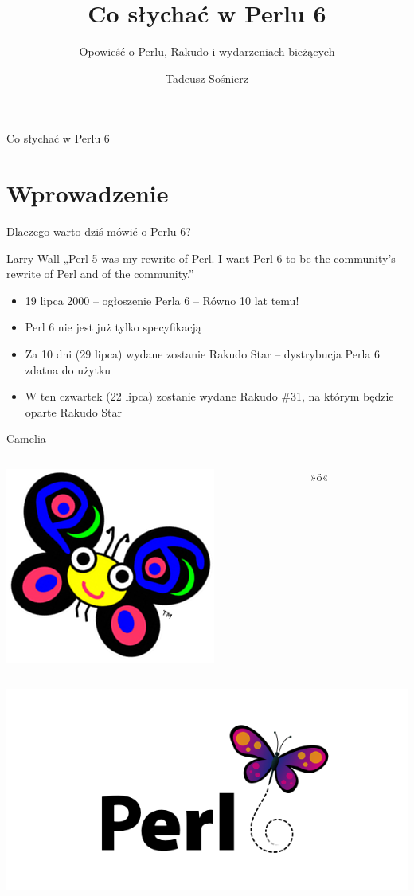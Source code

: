 \documentclass{beamer}
\title{Co słychać w Perlu 6}
\subtitle{Opowieść o Perlu, Rakudo i wydarzeniach bieżących}
\author{Tadeusz Sośnierz}
\begin{document}
\begin{frame}{Co słychać w Perlu 6}
	\titlepage
\end{frame}

			\section{Wprowadzenie}

\begin{frame}{Dlaczego warto dziś mówić o Perlu 6?}
	\begin{block}{Larry Wall}
		„Perl 5 was my rewrite of Perl. I want Perl 6 to be
		the community's rewrite of Perl
		and of the community.”
	\end{block}
	\pause
	\begin{itemize}
		\item 19 lipca 2000 -- ogłoszenie Perla 6
			-- Równo 10 lat temu!
		\pause
		\item Perl 6 nie jest już tylko specyfikacją
		\pause
		\item Za 10 dni (29 lipca) wydane zostanie Rakudo Star
			-- dystrybucja Perla 6 zdatna do użytku
		\pause
		\item W ten czwartek (22 lipca) zostanie wydane Rakudo \#31,
			na którym będzie oparte Rakudo Star
	\end{itemize}
\end{frame}

\begin{frame}{Camelia}
	\begin{columns}
		\begin{column}{0.5\textwidth}
			\includegraphics[scale=0.54]{camelia}
		\end{column}
		\begin{column}{0.5\textwidth}
			{\Huge »ö«}
		\end{column}
	\end{columns}
	\includegraphics[scale=0.38]{newlogo}
\end{frame}
\end{document}
